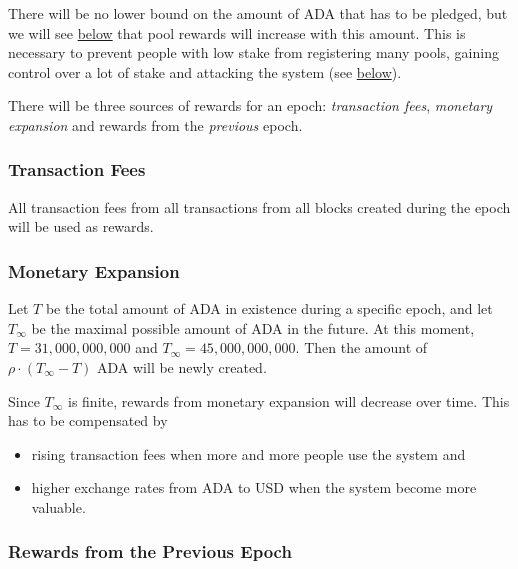 \documentclass[11pt,a4paper]{article}
\begin{document}
There will be no lower bound on the amount of ADA that has to be
pledged, but we will see \hyperref[pool-rewards]{below} that pool
rewards will increase with this amount. This is necessary to prevent
people with low stake from registering many pools, gaining control over
a lot of stake and attacking the system (see \hyperref[aux5f0]{below}).


There will be three sources of rewards for an epoch: \emph{transaction
fees}, \emph{monetary expansion} and rewards from the \emph{previous}
epoch.

\subsubsection{Transaction Fees}\label{transaction-fees-1}

All transaction fees from all transactions from all blocks created
during the epoch will be used as rewards.

\subsubsection{Monetary Expansion}\label{monetary-expansion}

Let \(T\) be the total amount of ADA in existence during a specific
epoch, and let \(T_\infty\) be the maximal possible amount of ADA in the
future. At this moment, \(T=31,000,000,000\) and
\(T_\infty=45,000,000,000\). Then the amount of
\(\rho\cdot(T_\infty - T)\) ADA will be newly created.

Since \(T_\infty\) is finite, rewards from monetary expansion will
decrease over time. This has to be compensated by

\begin{itemize}
\item
  rising transaction fees when more and more people use the system and
\item
  higher exchange rates from ADA to USD when the system become more
  valuable.
\end{itemize}

\subsubsection{Rewards from the Previous
Epoch}\label{rewards-from-the-previous-epoch}
\end{document}
